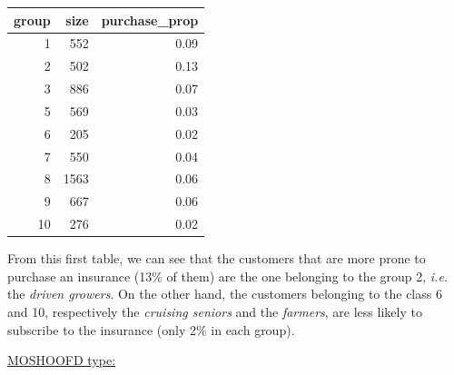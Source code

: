 \documentclass[
  12pt,
  oneside]{report}
\newenvironment{Shaded}{\begin{snugshade}}{\end{snugshade}}
\newcommand{\CommentTok}[1]{\textcolor[rgb]{0.56,0.35,0.01}{\textit{#1}}}
\newcommand{\DataTypeTok}[1]{\textcolor[rgb]{0.13,0.29,0.53}{#1}}
\newcommand{\DecValTok}[1]{\textcolor[rgb]{0.00,0.00,0.81}{#1}}
\newcommand{\KeywordTok}[1]{\textcolor[rgb]{0.13,0.29,0.53}{\textbf{#1}}}
\newcommand{\NormalTok}[1]{#1}
\newcommand{\OperatorTok}[1]{\textcolor[rgb]{0.81,0.36,0.00}{\textbf{#1}}}
\newcommand{\StringTok}[1]{\textcolor[rgb]{0.31,0.60,0.02}{#1}}
\begin{document}
\begin{tabular}{r|r|r}
\hline
group & size & purchase\_prop\\
\hline
1 & 552 & 0.09\\
\hline
2 & 502 & 0.13\\
\hline
3 & 886 & 0.07\\
\hline
5 & 569 & 0.03\\
\hline
6 & 205 & 0.02\\
\hline
7 & 550 & 0.04\\
\hline
8 & 1563 & 0.06\\
\hline
9 & 667 & 0.06\\
\hline
10 & 276 & 0.02\\
\hline
\end{tabular}

From this first table, we can see that the customers that are more prone to purchase an insurance (13\% of them) are the one belonging to the group 2, \emph{i.e.} the \emph{driven growers}. On the other hand, the customers belonging to the class 6 and 10, respectively the \emph{cruising seniors} and the \emph{farmers}, are less likely to subscribe to the insurance (only 2\% in each group).

\underline{MOSHOOFD type:}

\begin{Shaded}
\end{Shaded}
\end{document}
